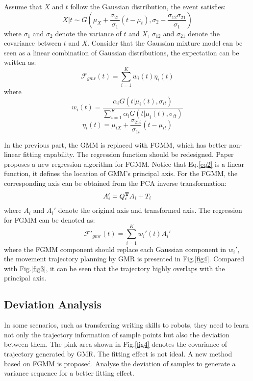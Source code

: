 \documentclass[journal]{IEEEtran}
\begin{document}
Assume that $X$ and $t$ follow the Gaussian distribution, the event satisfies:
\begin{equation}
    X|t \sim G(\mu_X+\frac{\sigma_{21}}{\sigma_{1}}(t-\mu_t),\sigma_{2}-\frac{\sigma_{12}\sigma_{21}}{\sigma_{1}})
\end{equation}
where $\sigma_{1}$ and $\sigma_{2}$ denote the variance of $t$ and $X$, $\sigma_{12}$ and $\sigma_{21}$ denote the covariance between $t$ and $X$. Consider that the Gaussian mixture model can be seen as a linear combination of Gaussian distributions, the expectation can be written as:
\begin{equation}
    \mathcal{F} _{gmr}(t)=\sum\limits_{i=1}^{K}w_i(t)\eta_i(t)
\end{equation}
where
\begin{equation}
    w_i(t)=\frac{\alpha_{i}G(t|\mu_{i}(t),\sigma_{it})}{\sum_{i=1}^{K}\alpha_{i}G(t|\mu_{i}(t),\sigma_{it})}
\end{equation}
\begin{equation}
    \eta_i(t)=\mu_{iX}+\frac{\sigma_{21i}}{\sigma_{1i}}(t-\mu_{it})
    \label{eq2}
\end{equation}

In the previous part, the GMM is replaced with FGMM, which has better non-linear fitting capability. The regression function should be redesigned. Paper\cite{Ju2012} proposes a new regression algorithm for FGMM. Notice that Eq.\ref{eq2} is a linear function, it defines the location of GMM's principal axis. For the FGMM, the corresponding axis can be obtained from the PCA inverse transformation:
\begin{equation}
    A_i'=Q_i^{\bf{T}}A_i+T_i
\end{equation}
where $A_i$ and $A_i'$ denote the original axis and transformed axis. The regression for FGMM can be denoted as:
\begin{equation}
    \mathcal{F}' _{gmr}(t)=\sum\limits_{i=1}^{K}w_i'(t)A_i'
\end{equation}
where the FGMM component should replace each Gaussian component in $w_i'$, the movement trajectory planning by GMR is presented in Fig.\ref{fig4}. Compared with Fig.\ref{fig3}, it can be seen that the trajectory highly overlaps with the principal axis.

\subsection{Deviation Analysis}
In some scenarios, such as transferring writing skills to robots, they need to learn not only the trajectory information of sample points but also the deviation between them. The pink area shown in Fig.\ref{fig4} denotes the covariance of trajectory generated by GMR. The fitting effect is not ideal. A new method based on FGMM is proposed. Analyse the deviation of samples to generate a variance sequence for a better fitting effect.
\end{document}
